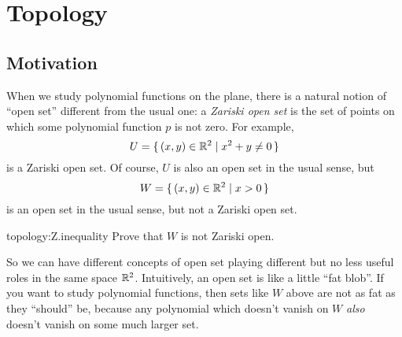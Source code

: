 \chapter{Topology}\label{chapter:topology.2}

\section{Motivation}
When we study polynomial functions on the plane, there is a natural notion of ``open set'' different from the usual one: a \emph{Zariski open set} is the set of points on which some polynomial function \(p\) is not zero.
For example, 
\[
U=\set{(x,y)\in \ensuremath{\mathbb{R}^{2}}|x^2+y \ne 0}
\]
is a Zariski open set.
Of course, \(U\) is also an open set in the usual sense, but
\[
W=\set{(x,y)\in\ensuremath{\mathbb{R}^{2}}|x>0}
\]
is an open set in the usual sense, but not a Zariski open set.
\begin{problem}{topology:Z.inequality}
Prove that \(W\) is not Zariski open.
\end{problem}
So we can have different concepts of open set playing different but no less useful roles in the same space \(\mathbb{R}^{2}\).
Intuitively, an open set is like a little ``fat blob''.
If you want to study polynomial functions, then sets like \(W\) above are not as fat as they ``should'' be, because any polynomial which doesn't vanish on \(W\) \emph{also} doesn't vanish on some much larger set.


